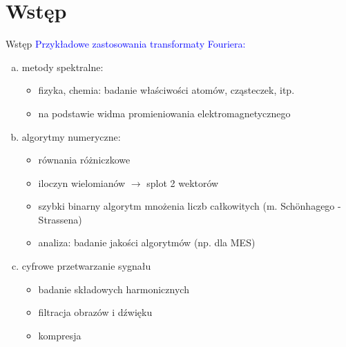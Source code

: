 \section{Wstęp}
\begin{frame}{Wstęp}
	\textcolor{blue}{Przykładowe zastosowania transformaty Fouriera:}
	
	\begin{enumerate}[a)]
		\item metody spektralne:
		\begin{itemize}
		    \item fizyka, chemia: badanie właściwości atomów, cząsteczek, itp.
			\item na podstawie widma promieniowania elektromagnetycznego
		\end{itemize}
        \item algorytmy numeryczne:
        \begin{itemize}
        	\item równania różniczkowe
            \item iloczyn wielomianów $\to$ splot 2 wektorów \\
			\item szybki binarny algorytm mnożenia liczb całkowitych
			(m. Sch\"{o}nhagego - Strassena)
        	\item analiza: badanie jakości algorytmów (np. dla MES)
        \end{itemize}
        \item cyfrowe przetwarzanie sygnału
        \begin{itemize}
        	\item badanie składowych harmonicznych
        	\item filtracja obrazów i dźwięku
        	\item kompresja
		\end{itemize}        	
	\end{enumerate}
\end{frame}